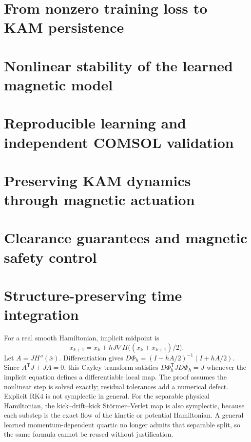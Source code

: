 \documentclass[doublespace,Afour,sageh,times]{sagej}
\theoremstyle{definition}
\begin{document}
\section{From nonzero training loss to KAM persistence}
\label{sec:transfer}


\section{Nonlinear stability of the learned magnetic model}
\label{sec:benchmark}




\section{Reproducible learning and independent COMSOL validation}
\label{sec:experiments}





\section{Preserving KAM dynamics through magnetic actuation}
\label{sec:kam-actuation}



\section{Clearance guarantees and magnetic safety control}
\label{sec:safety}




\section{Structure-preserving time integration}
\label{app:integrator}
For a real smooth Hamiltonian, implicit midpoint is
\begin{equation}
 x_{k+1}=x_k+hJ\nabla H\big((x_k+x_{k+1})/2\big).
\end{equation}
Let $A=JH''(\bar x)$. Differentiation gives $D\Phi_h=(I-hA/2)^{-1}(I+hA/2)$. Since $A^{\mathsf T}J+JA=0$, this Cayley transform satisfies $D\Phi_h^{\mathsf T}JD\Phi_h=J$ whenever the implicit equation defines a differentiable local map. The proof assumes the nonlinear step is solved exactly; residual tolerances add a numerical defect. Explicit RK4 is not symplectic in general. For the separable physical Hamiltonian, the kick--drift--kick St\"ormer--Verlet map is also symplectic, because each substep is the exact flow of the kinetic or potential Hamiltonian. A general learned momentum-dependent quartic no longer admits that separable split, so the same formula cannot be reused without justification.
\end{document}
